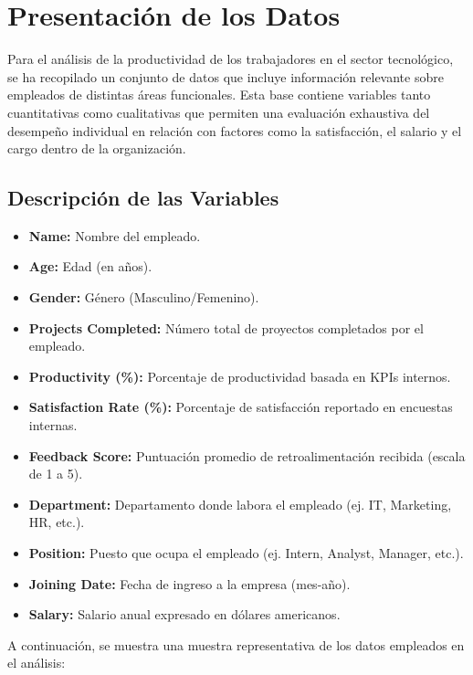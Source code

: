 \section{Presentación de los Datos}

Para el análisis de la productividad de los trabajadores en el sector tecnológico, se ha recopilado un conjunto de datos que incluye información relevante sobre empleados de distintas áreas funcionales. Esta base contiene variables tanto cuantitativas como cualitativas que permiten una evaluación exhaustiva del desempeño individual en relación con factores como la satisfacción, el salario y el cargo dentro de la organización.

\subsection{Descripción de las Variables}

\begin{itemize}
    \item \textbf{Name:} Nombre del empleado.
    \item \textbf{Age:} Edad (en años).
    \item \textbf{Gender:} Género (Masculino/Femenino).
    \item \textbf{Projects Completed:} Número total de proyectos completados por el empleado.
    \item \textbf{Productivity (\%):} Porcentaje de productividad basada en KPIs internos.
    \item \textbf{Satisfaction Rate (\%):} Porcentaje de satisfacción reportado en encuestas internas.
    \item \textbf{Feedback Score:} Puntuación promedio de retroalimentación recibida (escala de 1 a 5).
    \item \textbf{Department:} Departamento donde labora el empleado (ej. IT, Marketing, HR, etc.).
    \item \textbf{Position:} Puesto que ocupa el empleado (ej. Intern, Analyst, Manager, etc.).
    \item \textbf{Joining Date:} Fecha de ingreso a la empresa (mes-año).
    \item \textbf{Salary:} Salario anual expresado en dólares americanos.
\end{itemize}

A continuación, se muestra una muestra representativa de los datos empleados en el análisis:

